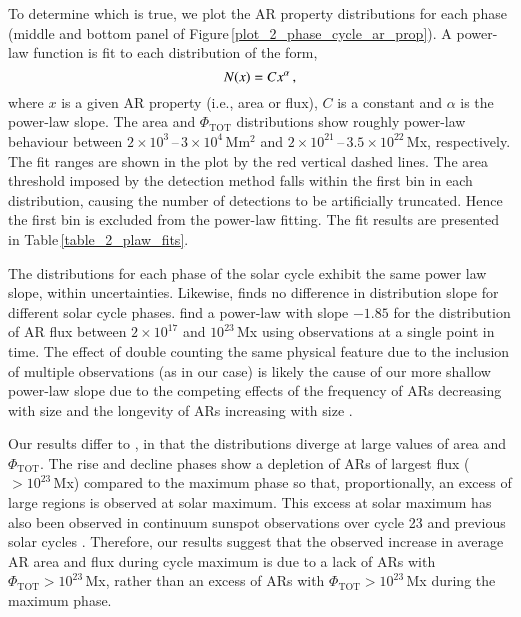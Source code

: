 \documentclass[namedreferences]{solarphysics}
\begin{document}
\begin{article}
To determine which is true, we plot the AR property distributions for each phase (middle and bottom panel of Figure\,\ref{plot_2_phase_cycle_ar_prop}). A power-law function is fit to each distribution %
 of the form,
\begin{equation}\label{eqn:powerlaw}
N(x) = C x^\alpha \mbox{\,,}
\end{equation}
where $x$ is a given AR property (i.e., area or flux), $C$ is a constant and $\alpha$ is the power-law slope. The area and $\Phi_{\mathrm{TOT}}$ distributions show roughly power-law behaviour between $2\times10^{3}$\,--\,$3\times10^4$\,Mm$^{2}$ and $2\times10^{21}$\,--\,$3.5\times10^{22}$\,Mx, respectively. The fit ranges are shown in the plot by the red vertical dashed lines. The area threshold imposed by the detection method falls within the first bin in each distribution, causing the number of detections to be artificially truncated. Hence the first bin is excluded from the power-law fitting. The fit results are presented in Table\,\ref{table_2_plaw_fits}.

The distributions for each phase of the solar cycle exhibit the same power law slope, within uncertainties. Likewise, \citet{harvey:1993} finds no difference in distribution slope for different solar cycle phases. \citet{Parnell:2009} find a power-law with slope $-1.85$ for the distribution of AR flux between $2\times10^{17}$ and $10^{23}$\,Mx using observations at a single point in time. The effect of double counting the same physical feature due to the inclusion of multiple observations (as in our case) is likely the cause of our more shallow power-law slope \citep{tang:1984} due to the competing effects of the frequency of ARs decreasing with size and the longevity of ARs increasing with size \citep{Lefevre:2011}.

Our results differ to \citet{harvey:1993}, in that the distributions diverge at large values of area and $\Phi_{\mathrm{TOT}}$. The rise and decline phases show a depletion of ARs of largest flux ($>10^{23}$\,Mx) compared to the maximum phase so that, proportionally, an excess of large regions is observed at solar maximum. This excess at solar maximum has also been observed in continuum sunspot observations over cycle 23 and previous solar cycles \citep{Hathaway:2010b,Lefevre:2011,Kilcik:2011,deToma:2013}. Therefore, our results suggest that the observed increase in average AR area and flux during cycle maximum is due to a lack of ARs with $\Phi_{\mathrm{TOT}} >10^{23}$\,Mx, rather than an excess of ARs with $\Phi_{\mathrm{TOT}} >10^{23}$\,Mx during the maximum phase.


\end{article}
\end{document}
